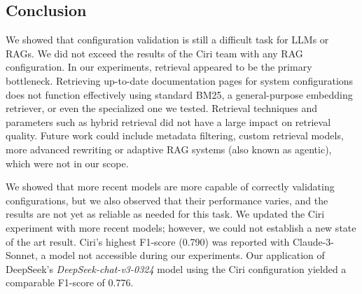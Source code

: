 \subsection{Conclusion} \label{sec:exp_conclusion}

We showed that configuration validation is still a difficult task for LLMs or RAGs. We did not exceed the results of the Ciri team with any RAG configuration. In our experiments, retrieval appeared to be the primary bottleneck. Retrieving up-to-date documentation pages for system configurations does not function effectively using standard BM25, a general-purpose embedding retriever, or even the specialized one we tested. Retrieval techniques and parameters such as hybrid retrieval did not have a large impact on retrieval quality. Future work could include metadata filtering, custom retrieval models, more advanced rewriting or adaptive RAG systems (also known as agentic), which were not in our scope.

We showed that more recent models are more capable of correctly validating configurations, but we also observed that their performance varies, and the results are not yet as reliable as needed for this task. We updated the Ciri experiment with more recent models; however, we could not establish a new state of the art result. Ciri's highest F1-score (0.790) was reported with Claude-3-Sonnet, a model not accessible during our experiments. Our application of DeepSeek's \textit{DeepSeek-chat-v3-0324} model using the Ciri configuration yielded a comparable F1-score of 0.776.